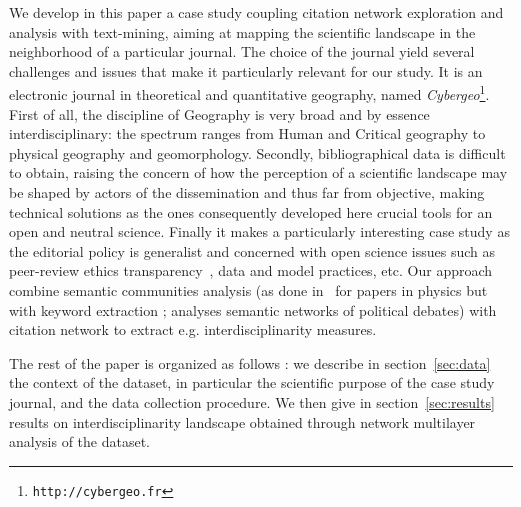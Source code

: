 
We develop in this paper a case study coupling citation network exploration and analysis with text-mining, aiming at mapping the scientific landscape in the neighborhood of a particular journal. The choice of the journal yield several challenges and issues that make it particularly relevant for our study. It is an electronic journal in theoretical and quantitative geography, named \textit{Cybergeo}\footnote{\texttt{http://cybergeo.fr}}. First of all, the discipline of Geography is very broad and by essence interdisciplinary: the spectrum ranges from Human and Critical geography to physical geography and geomorphology. Secondly, bibliographical data is difficult to obtain, raising the concern of how the perception of a scientific landscape may be shaped by actors of the dissemination and thus far from objective, making technical solutions as the ones consequently developed here crucial tools for an open and neutral science. Finally it makes a particularly interesting case study as the editorial policy is generalist and concerned with open science issues such as peer-review ethics transparency~\cite{10.1371/journal.pone.0147913}, data and model practices, etc. Our approach combine semantic communities analysis (as done in~\cite{2016arXiv160208451P} for papers in physics but with keyword extraction ; \cite{2015arXiv151003797G} analyses semantic networks of political debates) with citation network to extract e.g. interdisciplinarity measures.






The rest of the paper is organized as follows : we describe in section~\ref{sec:data} the context of the dataset, in particular the scientific purpose of the case study journal, and the data collection procedure. We then give in section~\ref{sec:results} results on interdisciplinarity landscape obtained through network multilayer analysis of the dataset.










